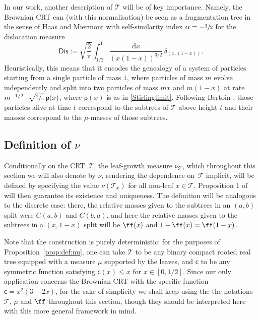 \documentclass[11pt]{article}
\newcommand{\pp}{\mathsf{p}}
\newcommand{\T}{\mathcal{T}}\let\CRT\T\let\tbr\T
\theoremstyle{definition}
\begin{document}
In our work, another description of $\mathcal{T}$ will be of key importance. Namely, the Brownian CRT can (with this normalisation) be seen as a fragmentation tree in the sense of Haas and Miermont \cite{HM04} with self-similarity index $\alpha = - \sfrac{1}{2}$ for the dislocation measure
\begin{equation}
\label{eq:Dislocation}
\mathsf{Dis} := \sqrt{\frac{2}{\pi}} \int_{1/2}^{1} \frac{ \mathrm{d}x}{(x(1-x))^{3/2}}\, \delta_{(x,(1-x))}.
\end{equation}
Heuristically, this means that it encodes the genealogy of a system of particles starting from a single particle of mass $1$, where particles of mass $m$ evolve independently and split into two particles of mass $mx$ and $m(1-x)$ at rate $m^{-1/2} \cdot \sqrt{\sfrac{2}{\pi}}\, \pp(x)$, where $\pp(x)$ is as in \eqref{Stirlinglimit}. Following Bertoin \cite{bertoin2002self}, those particles alive at time $t$ correspond to the subtrees of $\T$ above height $t$ and their masses correspond to the $\mu$-masses of those subtrees.

\subsection{Definition of $\nu$}
Conditionally on the CRT~$\mathcal{T}$, the leaf-growth measure $\nu_{\mathcal{T}}$, which throughout this section we will also denote by $\nu$, rendering the dependence on~$\mathcal{T}$ implicit, will be defined by specifying the value $\nu(\T_x)$ for all non-leaf $x\in\T$. Proposition 1 of \cite{Steph13} will then guarantee its existence and uniqueness. The definition will be analogous to the discrete case: there, the relative masses given to the subtrees in an $(a,b)$ split were $C(a,b)$ and $C(b,a)$, and here the relative masses given to the subtrees in a $(x,1-x)$ split will be $\ff(x)$ and $1-\ff(x)=\ff(1-x)$.

Note that the construction is purely deterministic: for the purposes of Proposition~\ref{prop:def:nu}, one can take $\T$ to be any binary compact rooted real tree equipped with a measure $\mu$ supported by the leaves, and $ \mathsf{c}$ to be any symmetric function satisfying $ \mathsf{c}(x) \leq x$ for $x \in [0,1/2]$. Since our only application concerns the Brownian CRT with the specific function $\mathsf{c}=x^2(3-2x)$, for the sake of simplicity we shall keep using the the notations $\mathcal{T}$, $\mu$ and $\ff$ throughout this section, though they should be interpreted here with this more general framework in mind.
\end{document}
